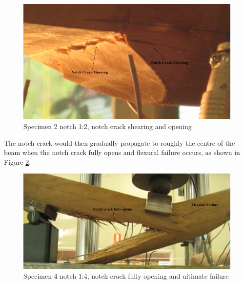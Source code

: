 \documentclass[11pt,a4paper]{article}
\numberwithin{equation}{subsection}
\begin{document}
\vspace*{\baselineskip}

\begin{figure}[h]
	\begin{center}
	\includegraphics[scale=0.39]{Roun_Crack_Open}
	\end{center}
	\caption{Specimen 2 notch 1:2, notch crack shearing and opening}
	\label{fig:Round_open}
\end{figure}

\pagebreak

\noindent
The notch crack would then gradually propagate to roughly the centre of the beam when the notch crack fully opens and flexural failure occurs, as shown in Figure \ref{fig:Round_Fail}.

\vspace*{\baselineskip}

\begin{figure}[h]
	\begin{center}
		\includegraphics[scale=0.4]{Round_Fail}
	\end{center}
	\caption{Specimen 4 notch 1:4, notch crack fully opening and ultimate failure}
	\label{fig:Round_Fail}
\end{figure}
\end{document}
